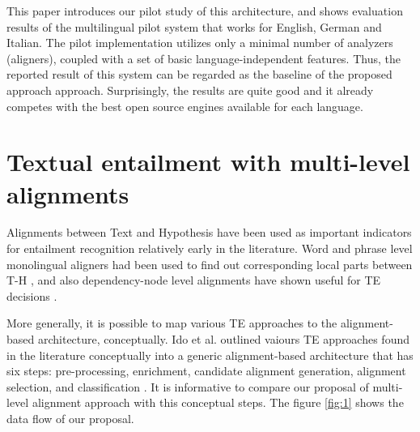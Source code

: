 \documentclass[11pt,letterpaper]{article}
\begin{document}
This paper introduces our pilot study of this architecture, and shows
evaluation results of the multilingual pilot system that works for
English, German and Italian. The pilot implementation utilizes only a
minimal number of analyzers (aligners), coupled with a set of basic
language-independent features. Thus, the reported result of this
system can be regarded as the baseline of the proposed approach
approach. Surprisingly, the results are quite good and it already
competes with the best open source engines available for each
language.       


\section{Textual entailment with multi-level alignments}
Alignments between Text and Hypothesis have been used as important
indicators for entailment recognition relatively early in the
literature. Word and phrase level monolingual aligners had been used
to find out corresponding local parts between T-H \cite{}, and also
dependency-node level alignments have shown useful for TE decisions
\cite{}.     

More generally, it is possible to map various TE approaches to
the alignment-based architecture, conceptually. Ido et al. outlined
vaiours TE approaches found in the literature conceptually into a
generic alignment-based architecture that has six steps:
pre-processing, enrichment, candidate alignment generation, alignment
selection, and classification \cite{}.   
It is informative to compare our proposal of multi-level alignment 
approach with this conceptual steps. The figure \ref{fig:1} shows the
data flow of our proposal. 
\end{document}
